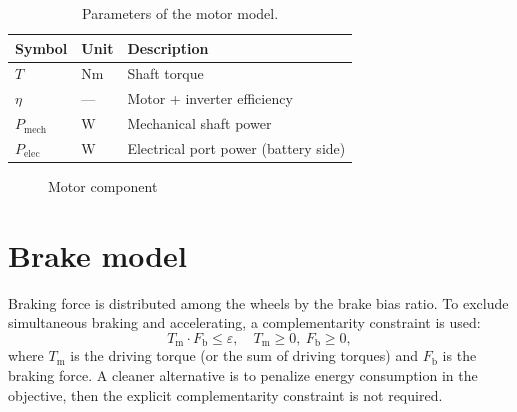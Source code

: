\begin{table}[!ht]
    \centering
    \begin{tabular}{lll}
        \hline
        \textbf{Symbol} & \textbf{Unit} & \textbf{Description} \\
        \hline
        $T$               & $\mathrm{Nm}$    & Shaft torque \\
        $\eta$            & ---              & Motor + inverter efficiency \\
        $P_\text{mech}$   & $\mathrm{W}$     & Mechanical shaft power \\
        $P_\text{elec}$   & $\mathrm{W}$     & Electrical port power (battery side) \\
        \hline
    \end{tabular}
    \caption{Parameters of the motor model.}\label{tab:motor-params}
\end{table}

\begin{figure}[H]
    \centering
    \caption{Motor component}\label{fig:motor}
\end{figure}

\section{Brake model}
Braking force is distributed among the wheels by the brake bias ratio. To exclude simultaneous braking and accelerating, a complementarity constraint is used:
\begin{equation}
	T_\mathrm{m} \cdot F_\mathrm{b} \le \varepsilon, \quad T_\mathrm{m} \ge 0,\ F_\mathrm{b} \ge 0,
\end{equation}
where $T_\mathrm{m}$ is the driving torque (or the sum of driving torques) and $F_\mathrm{b}$ is the braking force. A cleaner alternative is to penalize energy consumption in the objective, then the explicit complementarity constraint is not required.


